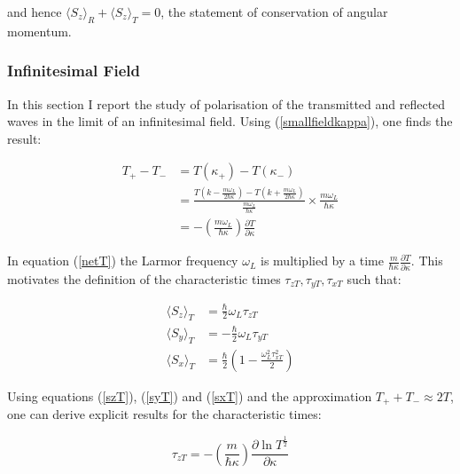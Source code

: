 \documentclass{article}
\begin{document}
\noindent and hence $\langle S_z \rangle_R + \langle S_z \rangle_T = 0$, the statement of conservation of angular momentum. 

\subsubsection{Infinitesimal Field}
In this section I report the study of polarisation of the transmitted and reflected waves in the limit of an infinitesimal field. Using (\ref{smallfieldkappa}), one finds the result:

\begin{subequations}
\begin{align}
	T_+-T_- &= T(\kappa_+)-T(\kappa_-)\\
		&= \frac{T(k-\frac{m\omega_L}{2\hbar\kappa})-T(k+\frac{m\omega_L}{2\hbar\kappa})}{\frac{m\omega_L}{\hbar\kappa}}\times \frac{m\omega_L}{\hbar\kappa} \\
		&=-\left(\frac{m\omega_L}{\hbar\kappa}\right)\frac{\partial T}{\partial \kappa} \label{netT}
\end{align}
\end{subequations}

\noindent In equation (\ref{netT}) the Larmor frequency $\omega_L$ is multiplied by a time $\frac{m}{\hbar\kappa}\frac{\partial T}{\partial \kappa}$. This motivates the definition of the characteristic times $\tau_{zT}, \tau_{yT}, \tau_{xT}$ such that:

\begin{subequations}  
\label{characteristictransmissiontimes}
\begin{align}	
	\langle S_z \rangle_T &= \frac{\hbar}{2}\omega_L\tau_{zT} \\
	\langle S_y \rangle_T &= -\frac{\hbar}{2}\omega_L\tau_{yT} \\
	\langle S_x \rangle_T &= \frac{\hbar}{2}\left(1-\frac{\omega_L^2\tau_{xT}^2}{2}\right)
\end{align}
\end{subequations}

\noindent Using equations (\ref{szT}), (\ref{syT}) and (\ref{sxT}) and the approximation $T_++T_- \approx 2T$, one can derive explicit results for the characteristic times:

\begin{equation}
	\tau_{zT} = -\left(\frac{m}{\hbar\kappa}\right)\frac{\partial \ln{T^{\frac{1}{2}}}}{\partial\kappa} \label{tauz}
\end{equation}
\end{document}
